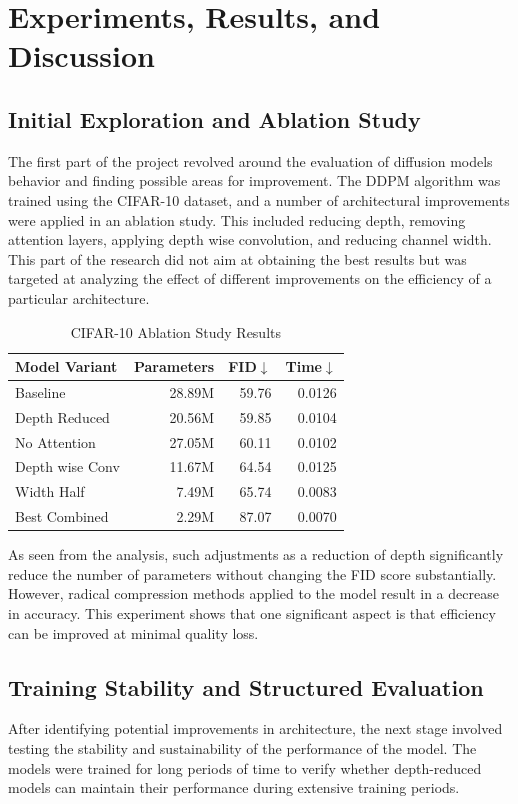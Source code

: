 \documentclass[journal]{IEEEtran}
\begin{document}
\section{Experiments, Results, and Discussion}
\subsection{Initial Exploration and Ablation Study}
The first part of the project revolved around the evaluation of diffusion models behavior and finding possible areas for improvement. The DDPM algorithm was trained using the CIFAR-10 dataset, and a number of architectural improvements were applied in an ablation study. This included reducing depth, removing attention layers, applying depth wise convolution, and reducing channel width. This part of the research did not aim at obtaining the best results but was targeted at analyzing the effect of different improvements on the efficiency of a particular architecture.

\begin{table}[t]
\caption{CIFAR-10 Ablation Study Results}
\label{tab:ablation}
\centering
\footnotesize
\setlength{\tabcolsep}{3.1pt}
\begin{tabular}{lrrr}
\toprule
Model Variant & Parameters & FID$\downarrow$ & Time$\downarrow$ \\
\midrule
Baseline & 28.89M & 59.76 & 0.0126 \\
Depth Reduced & 20.56M & 59.85 & 0.0104 \\
No Attention & 27.05M & 60.11 & 0.0102 \\
Depth wise Conv & 11.67M & 64.54 & 0.0125 \\
Width Half & 7.49M & 65.74 & 0.0083 \\
Best Combined & 2.29M & 87.07 & 0.0070 \\
\bottomrule
\end{tabular}
\end{table}

As seen from the analysis, such adjustments as a reduction of depth significantly reduce the number of parameters without changing the FID score substantially. However, radical compression methods applied to the model result in a decrease in accuracy. This experiment shows that one significant aspect is that efficiency can be improved at minimal quality loss.

\subsection{Training Stability and Structured Evaluation}
After identifying potential improvements in architecture, the next stage involved testing the stability and sustainability of the performance of the model. The models were trained for long periods of time to verify whether depth-reduced models can maintain their performance during extensive training periods.
\end{document}
